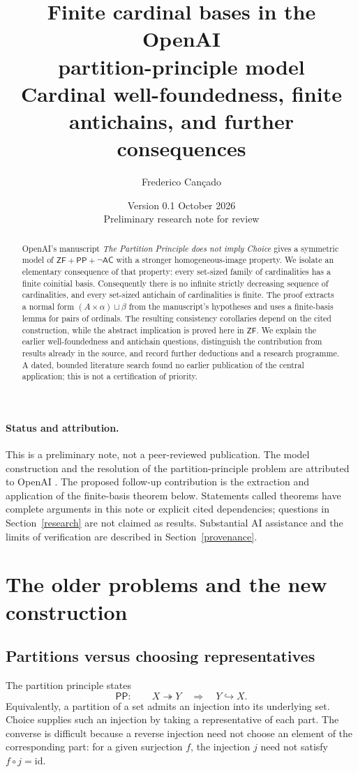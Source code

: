 \documentclass[11pt,a4paper]{article}
\title{\textbf{Finite cardinal bases in the OpenAI\\partition-principle model}\\[7pt]\large Cardinal well-foundedness, finite antichains, and further consequences}
\author{Frederico Cançado}
\date{Version 0.1 \quad 7 October 2026\\\small Preliminary research note for review}
\newcommand{\ZF}{\mathsf{ZF}}
\newcommand{\AC}{\mathsf{AC}}
\newcommand{\PP}{\mathsf{PP}}
\newcommand{\inj}{\hookrightarrow}
\newcommand{\onto}{\twoheadrightarrow}
\theoremstyle{definition}
\theoremstyle{remark}
\begin{document}
\maketitle
\begin{abstract}
OpenAI's manuscript \emph{The Partition Principle does not imply Choice} gives a symmetric model of $\ZF+\PP+\neg\AC$ with a stronger homogeneous-image property. We isolate an elementary consequence of that property: every set-sized family of cardinalities has a finite coinitial basis. Consequently there is no infinite strictly decreasing sequence of cardinalities, and every set-sized antichain of cardinalities is finite. The proof extracts a normal form $(A\times\alpha)\sqcup\beta$ from the manuscript's hypotheses and uses a finite-basis lemma for pairs of ordinals. The resulting consistency corollaries depend on the cited construction, while the abstract implication is proved here in $\ZF$. We explain the earlier well-foundedness and antichain questions, distinguish the contribution from results already in the source, and record further deductions and a research programme. A dated, bounded literature search found no earlier publication of the central application; this is not a certification of priority.
\end{abstract}

\paragraph{Status and attribution.}
This is a preliminary note, not a peer-reviewed publication. The model construction and the resolution of the partition-principle problem are attributed to OpenAI \cite{OpenAI}. The proposed follow-up contribution is the extraction and application of the finite-basis theorem below. Statements called theorems have complete arguments in this note or explicit cited dependencies; questions in Section~\ref{research} are not claimed as results. Substantial AI assistance and the limits of verification are described in Section~\ref{provenance}.

\section{The older problems and the new construction}\label{history}

\subsection{Partitions versus choosing representatives}
The partition principle states
\[
 \PP:\qquad X\onto Y\quad\Longrightarrow\quad Y\inj X.
\]
Equivalently, a partition of a set admits an injection into its underlying set. Choice supplies such an injection by taking a representative of each part. The converse is difficult because a reverse injection need not choose an element of the corresponding part: for a given surjection $f$, the injection $j$ need not satisfy $f\circ j=\mathrm{id}$.
\end{document}
